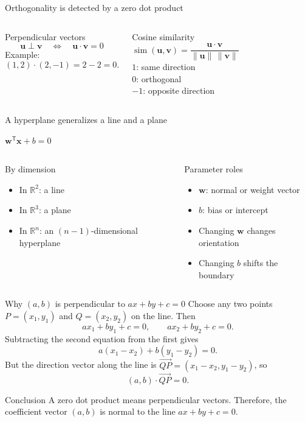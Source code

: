 \documentclass[aspectratio=169,11pt]{beamer}
\newcommand{\keyeq}[1]{%
  \begin{center}
  \setlength{\fboxsep}{9pt}%
  {\color{navy}$\displaystyle #1$}
  \end{center}}
\begin{document}
\begin{frame}{Orthogonality is detected by a zero dot product}
\begin{columns}[T,onlytextwidth]
\begin{block}{Perpendicular vectors}
\[
\bm u\perp\bm v\quad\Longleftrightarrow\quad \bm u\cdot\bm v=0
\]
Example:
\[
(1,2)\cdot(2,-1)=2-2=0.
\]
\end{block}
\begin{exampleblock}{Cosine similarity}
\[
\operatorname{sim}(\bm u,\bm v)=
\frac{\bm u\cdot\bm v}{\|\bm u\|\,\|\bm v\|}
\]
$1$: same direction\\
$0$: orthogonal\\
$-1$: opposite direction
\end{exampleblock}
\end{columns}
\end{frame}

\begin{frame}{A hyperplane generalizes a line and a plane}
\keyeq{\bm w^{\mathsf T}\bm x+b=0}
\begin{columns}[T,onlytextwidth]
\begin{block}{By dimension}
\begin{itemize}
  \item In $\mathbb R^2$: a line
  \item In $\mathbb R^3$: a plane
  \item In $\mathbb R^n$: an $(n-1)$-dimensional hyperplane
\end{itemize}
\end{block}
\begin{exampleblock}{Parameter roles}
\begin{itemize}
  \item $\bm w$: normal or weight vector
  \item $b$: bias or intercept
  \item Changing $\bm w$ changes orientation
  \item Changing $b$ shifts the boundary
\end{itemize}
\end{exampleblock}
\end{columns}
\end{frame}

\begin{frame}{Why $(a,b)$ is perpendicular to $ax+by+c=0$}
Choose any two points $P=(x_1,y_1)$ and $Q=(x_2,y_2)$ on the line. Then
\[
ax_1+by_1+c=0,
\qquad
ax_2+by_2+c=0.
\]
Subtracting the second equation from the first gives
\[
a(x_1-x_2)+b(y_1-y_2)=0.
\]
But the direction vector along the line is $\overrightarrow{QP}=(x_1-x_2,y_1-y_2)$, so
\[
(a,b)\cdot\overrightarrow{QP}=0.
\]
\begin{exampleblock}{Conclusion}
A zero dot product means perpendicular vectors. Therefore, the coefficient vector $(a,b)$ is normal to the line $ax+by+c=0$.
\end{exampleblock}
\end{frame}
\end{document}
